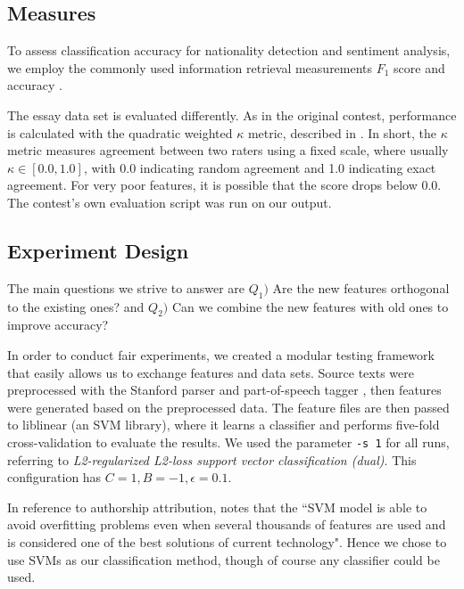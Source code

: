 \documentclass[conference]{IEEEtran}
\begin{document}


\subsection{Measures}

To assess classification accuracy for nationality detection and sentiment
analysis, we employ the commonly used information retrieval measurements $F_1$
score and accuracy \cite{rocai-caruana-2004}.

The essay data set is evaluated differently. As in the original contest,
performance is calculated with the quadratic weighted $\kappa$ metric, described
in \cite{pb-cohen-1968}.  In short, the $\kappa$ metric measures agreement
between two raters using a fixed scale, where usually $\kappa\in [0.0, 1.0]$,
with 0.0 indicating random agreement and 1.0 indicating exact agreement. For
very poor features, it is possible that the score drops below 0.0. The contest's
own evaluation script was run on our output.

\subsection{Experiment Design}

The main questions we strive to answer are $Q_1)$ Are the new features
orthogonal to the existing ones? and $Q_2)$ Can we combine the new features with
old ones to improve accuracy?

In order to conduct fair experiments, we created a modular testing framework
that easily allows us to exchange features and data sets. Source texts were
preprocessed with the Stanford parser \cite{stanford-parser} and
part-of-speech tagger \cite{stanford-pos}, then features were generated
based on the preprocessed data. The feature files are then passed to liblinear
\cite{liblinear} (an SVM library), where it learns a classifier and performs
five-fold cross-validation to evaluate the results. We used the parameter
\texttt{-s 1} for all runs, referring to \emph{L2-regularized L2-loss support
vector classification (dual)}. This configuration has $C=1,B=-1,\epsilon =
0.1$.

In reference to authorship attribution, \cite{jasist-stamatatos-2009} notes
that the ``SVM model is able to avoid overfitting problems even when several
thousands of features are used and is considered one of the best solutions of
current technology". Hence we chose to use SVMs as our classification method,
though of course any classifier could be used.
\end{document}
